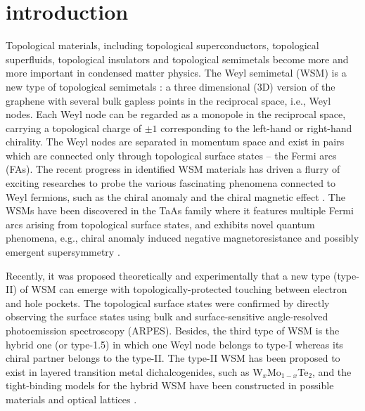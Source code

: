 \documentclass[twocolumn,superscriptaddress]{revtex4}%
\begin{document}
\section{introduction}
Topological materials, including topological superconductors, topological
superfluids, topological insulators and topological semimetals become more and
more important in condensed matter physics. The Weyl semimetal (WSM) is a new
type of topological semimetals
\cite{BalentsL2011,SavrasovSY2011,NinomiyaM1983,FangZ2011,RanY2011,QiXL2013,VanderbiltD2014,MiyakeT2015,DaiX2015,HuangSM2015}%
: a three dimensional (3D) version of the graphene with several bulk gapless
points in the reciprocal space, i.e., Weyl nodes. Each Weyl node can be
regarded as a monopole in the reciprocal space, carrying a topological charge
of $\pm1$ corresponding to the left-hand or right-hand chirality. The Weyl
nodes are separated in momentum space and exist in pairs which are connected
only through topological surface states -- the Fermi arcs (FAs). The recent
progress in identified WSM materials
\cite{SoljacicM2015,DingH2015,DingHDaiX2015,YanB2015NP,HasanMZ2015} has driven
a flurry of exciting researches to probe the various fascinating phenomena
connected to Weyl fermions, such as the chiral anomaly and the chiral magnetic
effect \cite{NinomiyaN1983,AjiV2012,YamamotoN2012,BurkovAA2012}. The WSMs have
been discovered in the \textrm{TaAs} family where it features multiple Fermi
arcs arising from topological surface states\cite{LvBQ2015,YangLX2015}, and
exhibits novel quantum phenomena, e.g., chiral anomaly induced negative
magnetoresistance \cite{SpivakBZ2013,HuangX2015} and possibly emergent
supersymmetry \cite{YaoH2015}.

Recently, it was proposed theoretically and experimentally that a new type
(type-II) of WSM \cite{SoluyanovAA2015,WangZJ2016,BernevigBA} can emerge with
topologically-protected touching between electron and hole pockets. The
topological surface states were confirmed by directly observing the surface
states using bulk and surface-sensitive angle-resolved photoemission
spectroscopy (ARPES). Besides, the third type of WSM is the hybrid one (or
type-1.5) in which one Weyl node belongs to type-I whereas its chiral partner
belongs to the type-II. The type-II WSM has been proposed to exist in layered
transition metal dichalcogenides, such as W$_{x}$Mo$_{1-x}$Te$_{2}%
$\cite{YanB2015PRB,QiY2016,ChangTR2016}, and the tight-binding models for the
hybrid WSM have been constructed in possible materials and optical lattices
\cite{kongxiao2017,chengang2016}.
\end{document}
